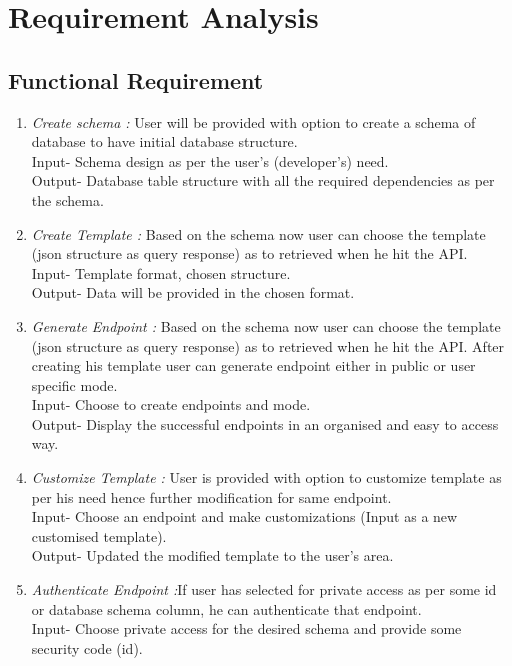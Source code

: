 \documentclass[a4paper,12pt]{report}
\begin{document}
    \section{Requirement Analysis}    
    \subsection{Functional Requirement}
    \begin{enumerate}
      \item {\emph {Create schema :} User will be provided with option to create a schema of database to have initial database structure. \\
      Input- Schema design as per the user’s (developer’s) need.  \\
      Output- Database table structure with all the required dependencies as per the schema.}
      \item {\emph {Create Template :} Based on the schema now user can choose the template (json structure as query response) as to retrieved when he hit the API. \\
        Input- Template format, chosen structure. \\
        Output- Data will be provided in the chosen format.
      }
      \item {\emph {Generate Endpoint :} Based on the schema now user can choose the template (json structure as query response) as to retrieved when he hit the API. After creating his template user can generate endpoint either in public or user specific mode.\\
        Input- Choose to create endpoints and mode. \\
        Output- Display the successful endpoints in an organised and easy to access way.
      }
      \item {\emph {Customize Template : } User is provided with option to customize template as per his need hence further modification for same endpoint.\\
        Input- Choose an endpoint and make customizations (Input as a new customised template).\\
        Output- Updated the modified template to the user’s area.
        }                        
      \item {\emph {Authenticate Endpoint :}If user has selected for private access as per some id or database schema column, he can authenticate that endpoint.\\
        Input- Choose private access for the desired schema and provide some security code (id).\\
}
\end{enumerate}
\end{document}
